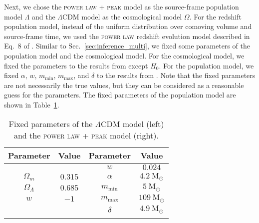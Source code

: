 \documentclass[sn-aps, pdflatex, iicol]{sn-jnl}
\begin{document}
Next, we chose the \textsc{power law + peak} model as the source-frame population model $\Lambda$ and the $\Lambda$CDM model as the cosmological model $\Omega$.
For the redshift population model, instead of the uniform distribution over comoving volume and source-frame time, we used the \textsc{power law} redshift evolution model described in Eq.~8 of \cite{KAGRA:2021duu}.
Similar to Sec.~\ref{sec:inference_multi}, we fixed some parameters of the population model and the cosmological model.
For the cosmological model, we fixed the parameters to the results from \cite{Planck:2018vyg} except $H_0$.
For the population model, we fixed $\alpha$, $w$, $m_\mathrm{min}$, $m_\mathrm{max}$, and $\delta$ to the results from \cite{LIGOScientific:2021aug}.
Note that the fixed parameters are not necessarily the true values, but they can be considered as a reasonable guess for the parameters.
The fixed parameters of the population model are shown in Table~\ref{tab:fixed_parameters}.
\begin{table}[htbp]
    \caption{Fixed parameters of the $\Lambda$CDM model (left) and the \textsc{power law + peak} model (right).}
    \begin{tabular}{cc|cc}
        \toprule
        Parameter & Value & Parameter & Value  \\
        \midrule
         & & $w$ & $0.024$ \\
        $\Omega_m$ & $0.315$ & $\alpha$ & $4.2\ \mathrm{M}_\odot$\\
        $\Omega_\Lambda$ & $0.685$ & $m_\mathrm{min}$ & $5\ \mathrm{M}_\odot$ \\
        $w$ & $-1$ & $m_\mathrm{max}$ & $109\ \mathrm{M}_\odot$ \\
         & & $\delta$ & $4.9\ \mathrm{M}_\odot$\\
        \botrule
    \end{tabular}
    \label{tab:fixed_parameters}
\end{table}
\end{document}
